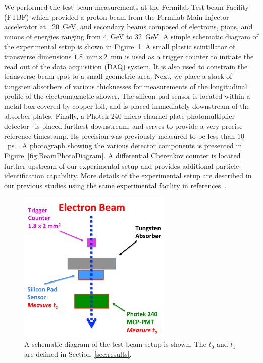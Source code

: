 \documentclass[12pt]{article}
\begin{document}
{We performed the test-beam measurements at the Fermilab Test-beam Facility
(FTBF) which provided a proton beam from the Fermilab Main Injector accelerator
at $120$~GeV, and secondary beams composed of electrons, pions, and muons of
energies ranging from $4$~GeV to $32$~GeV. A simple schematic diagram of the
experimental setup is shown in Figure~\ref{fig:BeamSchematicDiagram}. A small
plastic scintillator of transverse dimensions $1.8$~mm$\times 2$~mm is used as a
trigger counter to initiate the read out of the data acquisition (DAQ) system.
It is also used to constrain the transverse beam-spot to a small geometric area.
Next, we place a stack of tungsten absorbers of various thicknesses for
measurements of the longitudinal profile of the electromagnetic shower. The
silicon pad sensor is located within a metal box covered by copper foil, and is
placed immediately downstream of the absorber plates. Finally, a Photek 240
micro-channel plate photomultiplier detector~\cite{Anderson:2015gha,
MCPFastCaloNIMA, Ronzhin2015288,Ronzhin201552} is placed furthest downstream,
and serves to provide a very precise reference timestamp. Its precision was
previously measured to be less than $10$~ps~\cite{MCPShowerMaxPaper}. 
A photograph showing the various
detector components is presented in Figure~\ref{fig:BeamPhotoDiagram}. A
differential Cherenkov counter is located further upstream of our experimental
setup and provides additional particle identification capability. More
details of the experimental setup are described in our previous studies using
the same experimental facility in references~\cite{Anderson:2015gha,
MCPFastCaloNIMA, Ronzhin2015288,Ronzhin201552}.

\begin{figure}[htbp] 
\centering
\includegraphics[width=0.65\textwidth]{plots/BeamSchematicDiagram.pdf} 
\caption{A schematic diagram of the test-beam setup is shown. The $t_0$ and $t_1$ are defined in Section~\ref{sec:results}.} 
\label{fig:BeamSchematicDiagram} 
\end{figure} 

}
\end{document}
